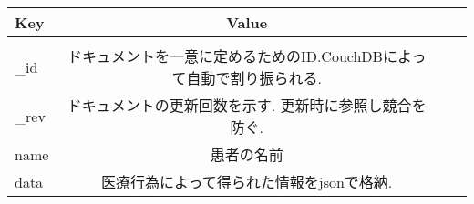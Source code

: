 	\begin{table}[htb]
		\begin{tabular}{|l|c|r|r|}\hline
		Key & Value \\ \hline \\ \hline
		_id & ドキュメントを一意に定めるためのID.CouchDBによって自動で割り振られる. \\ \hline
		_rev & ドキュメントの更新回数を示す. 更新時に参照し競合を防ぐ. \\ \hline
		name & 患者の名前 \\ \hline
		data & 医療行為によって得られた情報をjsonで格納. \\ \hline
		\end{tabular}
	\end{table}
